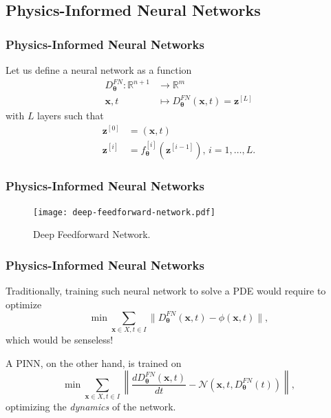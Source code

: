 \documentclass[t]{beamer}
\newcommand{\R}{\mathbb{R}}
\begin{document}
\subsection{Physics-Informed Neural Networks}

\begin{frame}
    \frametitle{Physics-Informed Neural Networks}
    Let us define a neural network as a function
    \begin{align*}
	D^{FN}_{\bm{\theta}}: \R^{n+1} &\longrightarrow \R^{m} \\
	\bm{x},t &\longmapsto 	D^{FN}_{\bm{\theta}}(\bm{x}, t) = \bm{z}^{[L]}
    \end{align*}
    with $L$ layers such that
    \begin{align*}
	\bm{z}^{[0]} &= \left( \bm{x},t \right)  \\
	\bm{z}^{[i]} &= f^{[i]}_{\bm{\theta}}\left( \bm{z}^{[i-1]} \right) ,\,i=1,\ldots,L
    .\end{align*}
\end{frame}

\begin{frame}
    \frametitle{Physics-Informed Neural Networks}

    \begin{figure}[h]
        \centering
        \texttt{[image: deep-feedforward-network.pdf]}
        \caption{Deep Feedforward Network.}
        \label{fig:deep-feedforward-network-pdf}
    \end{figure}
\end{frame}

\begin{frame}
    \frametitle{Physics-Informed Neural Networks}
    Traditionally, training such neural network to solve a PDE would require to optimize \[
	\min \sum_{\bm{x}\in X, t\in I} \|D^{FN}_{\bm{\theta}}(\bm{x}, t) - \phi(\bm{x}, t)\|
    ,\] 
    which would be senseless! \pause

    A PINN\cite{Raissi2019}, on the other hand, is trained on \[
    \min \sum_{\bm{x}\in X, t \in I} \left\|  \frac{d D^{FN}_{\bm{\theta}}(\bm{x}, t)}{dt} - \mathcal{N}\left( \bm{x}, t, D^{FN}_{\bm{\theta}}(t) \right) \right\| 
    ,\] 
    optimizing the \emph{dynamics} of the network.
\end{frame}
\end{document}
